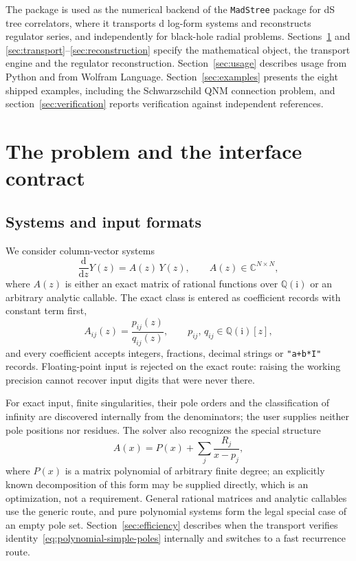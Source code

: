 \documentclass[11pt,a4paper]{article}
\newcommand{\dd}{\mathrm d}
\newcommand{\ii}{\mathrm i}
\begin{document}
The package is used as the numerical backend of the \texttt{MadStree} package for dS tree
correlators, where it transports d log-form systems and reconstructs regulator series, and
independently for black-hole radial problems. Sections~\ref{sec:contract} and
\ref{sec:transport}--\ref{sec:reconstruction} specify the mathematical object, the
transport engine and the regulator reconstruction. Section~\ref{sec:usage} describes usage
from Python and from Wolfram Language. Section~\ref{sec:examples} presents the eight
shipped examples, including the Schwarzschild QNM connection problem, and
section~\ref{sec:verification} reports verification against independent references.

\section{The problem and the interface contract}
\label{sec:contract}

\subsection{Systems and input formats}
\label{sec:systems}

We consider column-vector systems
\begin{equation}
  \frac{\dd}{\dd z}Y(z)=A(z)\,Y(z),
  \qquad A(z)\in\mathbb C^{N\times N},
  \label{eq:matrix-system}
\end{equation}
where $A(z)$ is either an exact matrix of rational functions over $\mathbb Q(\ii)$ or an
arbitrary analytic callable. The exact class is entered as coefficient records with
constant term first,
\begin{equation}
  A_{ij}(z)=\frac{p_{ij}(z)}{q_{ij}(z)},\qquad
  p_{ij},\,q_{ij}\in\mathbb Q(\ii)[z],
  \label{eq:rational-entries}
\end{equation}
and every coefficient accepts integers, fractions, decimal strings or
\texttt{"a+b*I"} records. Floating-point input is rejected on the exact route: raising the
working precision cannot recover input digits that were never there.

For exact input, finite singularities, their pole orders and the classification of infinity
are discovered internally from the denominators; the user supplies neither pole positions
nor residues. The solver also recognizes the special structure
\begin{equation}
  A(x)=P(x)+\sum_j\frac{R_j}{x-p_j},
  \label{eq:polynomial-simple-poles}
\end{equation}
where $P(x)$ is a matrix polynomial of arbitrary finite degree; an explicitly known
decomposition of this form may be supplied directly, which is an optimization, not a
requirement. General rational matrices and analytic callables use the generic route, and
pure polynomial systems form the legal special case of an empty pole set.
Section~\ref{sec:efficiency} describes when the transport verifies
identity~\eqref{eq:polynomial-simple-poles} internally and switches to a fast recurrence
route.
\end{document}
